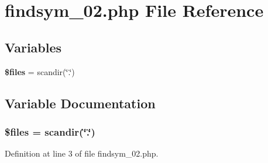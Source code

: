 \section{findsym\_\-02.php File Reference}
\label{findsym__02_8php}
\subsection*{Variables}
\begin{CompactItemize}
\item 
{\bf \$files} = scandir(\char`\"{}.\char`\"{})
\end{CompactItemize}


\subsection{Variable Documentation}
\subsubsection{\setlength{\rightskip}{0pt plus 5cm}\$files = scandir(\char`\"{}.\char`\"{})}\label{findsym__02_8php_9590b15215a21e9b42eb546aeef79704}




Definition at line 3 of file findsym\_\-02.php.